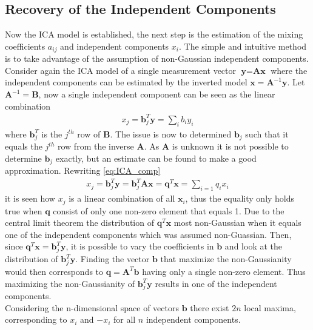 \subsection{Recovery of the Independent Components}\label{sec:est_ica}
Now the ICA model is established, the next step is the estimation of the mixing coefficients $a_{ij}$ and independent components $x_i$. The simple and intuitive method is to take advantage of the assumption of non-Gaussian independent components. Consider again the ICA model of a single measurement vector $\textbf{y}=\textbf{Ax}$ where the independent components can be estimated by the inverted model $\textbf{x}=\textbf{A}^{-1}\textbf{y}$. Let $\textbf{A}^{-1}=\textbf{B}$, now a single independent component can be seen as the linear combination 
\begin{align}
x_j = \textbf{b}_{j}^T \textbf{y} = \sum_{i}b_iy_i \label{eq:ICA_comp}
\end{align} 
where $\textbf{b}_{j}^T$ is the $j^{th}$ row of $\textbf{B}$. The issue is now to determined $\textbf{b}_j$ such that it equals the $j^{th}$ row from the inverse $\textbf{A}$. As $\textbf{A}$ is unknown it is not possible to determine $\textbf{b}_j$ exactly, but an estimate can be found to make a good approximation. Rewriting \eqref{eq:ICA_comp} 
\begin{align*}
x_j = \textbf{b}_{j}^T \textbf{y} = \textbf{b}_{j}^T \textbf{Ax} = \textbf{q}^T\textbf{x} = \sum_{i=1}q_i x_i
\end{align*}
it is seen how $x_j$ is a linear combination of all $\textbf{x}_i$, thus the equality only holds true when $\textbf{q}$ consist of only one non-zero element that equals 1.  
Due to the central limit theorem the distribution of $\textbf{q}^T\textbf{x}$ most non-Gaussian when it equals one of the independent components which was assumed non-Guassian. Then, since $\textbf{q}^T\textbf{x} = \textbf{b}_{j}^T \textbf{y}$, it is possible to vary the coefficients in $\textbf{b}$ and look at the distribution of $\textbf{b}_{j}^T \textbf{y}$. Finding the vector $\textbf{b}$ that maximize the non-Gaussianity would then corresponds to $\textbf{q}=\textbf{A}^T\textbf{b}$ having only a single non-zero element. Thus maximizing the non-Gaussianity of $\textbf{b}_{j}^T \textbf{y}$ results in one of the independent components\cite[p. 166]{ICA}. \\
Considering the n-dimensional space of vectors $\textbf{b}$ there exist $2n$ local maxima, corresponding to $x_i$ and $-x_i$ for all $n$ independent components\cite[p. 166]{ICA}. 

